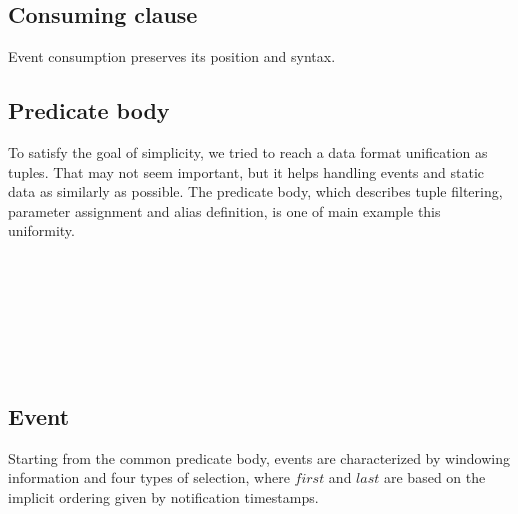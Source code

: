 \subsection{Consuming clause}
Event consumption preserves its position and syntax.
\begin{bnf*}
\end{bnf*}

\subsection{Predicate body}
To satisfy the goal of simplicity, we tried to reach a data format unification as tuples. That may not seem important, but it helps handling events and static data as similarly as possible. The predicate body, which describes tuple filtering, parameter assignment and alias definition, is one of main example this uniformity.
\begin{bnf*}
\\
\\
\\
\\
\\
\\
\end{bnf*}

\subsection{Event}
Starting from the common predicate body, events are characterized by windowing information and four types of selection, where $first$ and $last$ are based on the implicit ordering given by notification timestamps.
\begin{bnf*}
\\
\end{bnf*}

